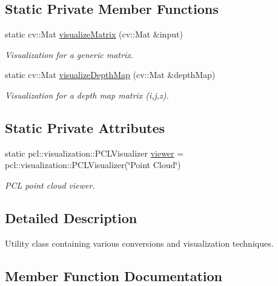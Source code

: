 \subsection*{Static Private Member Functions}
\begin{DoxyCompactItemize}
\item 
static cv\+::\+Mat \hyperlink{class_visualizer_a1ed923a0bdac0f3328af7aceb4d85e0e}{visualize\+Matrix} (cv\+::\+Mat \&input)
\begin{DoxyCompactList}\small\item\em Visualization for a generic matrix. \end{DoxyCompactList}\item 
static cv\+::\+Mat \hyperlink{class_visualizer_a5af40bebe3119c1d605351f42d2d8b95}{visualize\+Depth\+Map} (cv\+::\+Mat \&depth\+Map)
\begin{DoxyCompactList}\small\item\em Visualization for a depth map matrix (i,j,z). \end{DoxyCompactList}\end{DoxyCompactItemize}
\subsection*{Static Private Attributes}
\begin{DoxyCompactItemize}
\item 
\hypertarget{class_visualizer_a82cad28f5c39579414f73bda01d11000}{}\label{class_visualizer_a82cad28f5c39579414f73bda01d11000} 
static pcl\+::visualization\+::\+P\+C\+L\+Visualizer \hyperlink{class_visualizer_a82cad28f5c39579414f73bda01d11000}{viewer} = pcl\+::visualization\+::\+P\+C\+L\+Visualizer(\char`\"{}Point Cloud\char`\"{})
\begin{DoxyCompactList}\small\item\em P\+CL point cloud viewer. \end{DoxyCompactList}\end{DoxyCompactItemize}


\subsection{Detailed Description}
Utility class containing various conversions and visualization techniques. 

\subsection{Member Function Documentation}
\hypertarget{class_visualizer_af65e36aaef7c1f60d0f79819f17707d7}{}\label{class_visualizer_af65e36aaef7c1f60d0f79819f17707d7} 
